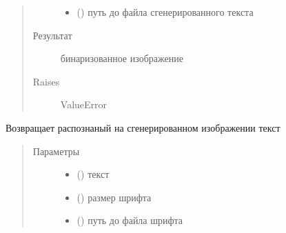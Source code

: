\documentclass[letterpaper,10pt,russian]{sphinxmanual}
\begin{document}
\begin{fulllineitems}
\begin{fulllineitems}
\begin{quote}
\begin{description}
\begin{itemize}
\item {} 
 () \textendash{} путь до файла сгенерированного текста

\end{itemize}

\item[{Результат}] \leavevmode
{} \textendash{} бинаризованное изображение

\item[{Raises}] \leavevmode
ValueError

\end{description}\end{quote}

\end{fulllineitems}


\begin{fulllineitems}
\label{\detokenize{OCRImage:image.OCRImage.get_text_recognized_image}}
Возвращает распознаный на сгенерированном изображении текст
\begin{quote}\begin{description}
\item[{Параметры}] \leavevmode\begin{itemize}
\item {} 
 () \textendash{} текст

\item {} 
 () \textendash{} размер шрифта

\item {} 
 () \textendash{} путь до файла шрифта


\end{itemize}
\end{description}
\end{quote}
\end{fulllineitems}
\end{fulllineitems}
\end{document}
